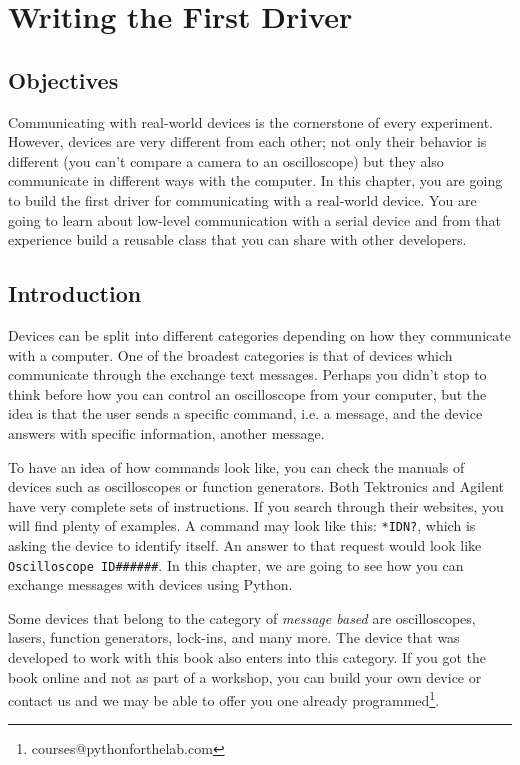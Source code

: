 \chapter{Writing the First Driver}
\section{Objectives}
Communicating with real-world devices is the cornerstone of every
experiment. However, devices are very different from each other; not
only their behavior is different (you can't compare a camera to an oscilloscope) 
but they also communicate in different ways with the computer. In this chapter, 
you are going to build the first driver for
communicating with a real-world device. You are going to learn about
low-level communication with a serial device and from that experience
build a reusable class that you can share with other developers. 

\section{Introduction}
Devices can be split into different categories depending on how they
communicate with a computer. One of the broadest categories is that of devices which communicate through the exchange text messages. Perhaps you didn't stop to think before how you can control an oscilloscope from your computer, but the idea is that the user sends
a specific command, i.e. a message, and the device answers with specific information, another message. 

To have an idea of how commands look like, you can check the manuals of devices such as oscilloscopes or function generators. Both Tektronics and Agilent have very complete sets of instructions. If you search through their websites, you will find plenty of examples. A command may look like this: 
\texttt{*IDN?}, which is asking the device to identify itself. An 
answer to that request would look like \texttt{Oscilloscope ID######}. 
In this chapter, we are going to see how you can exchange messages with devices 
using Python.

Some devices that belong to the category of \textit{message based} are oscilloscopes, lasers,
function generators, lock-ins, and many more. The device that was developed to work with this book also enters into this category. If you got the book online and not as part of a workshop, you can build your own device or contact us and we may be able to offer you one already 
programmed\footnote{courses@pythonforthelab.com}.

